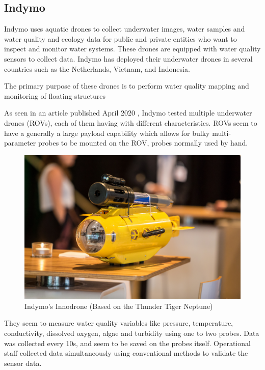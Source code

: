 \subsection{Indymo}
Indymo uses aquatic drones to collect underwater images, water samples and water quality and ecology data for public and private entities who want to inspect and monitor water systems. These drones are equipped with water quality sensors to collect data. Indymo has deployed their underwater drones in several countries such as the Netherlands, Vietnam, and Indonesia. \cite{indymoindonesia}

The primary purpose of these drones is to perform water quality mapping and monitoring of floating structures

As seen in an article published April 2020 \cite{indymoarticle}, Indymo tested multiple underwater drones (ROVs), each of them having with different characteristics. ROVs seem to have a generally a large payload capability which allows for bulky multi-parameter probes to be mounted on the ROV, probes normally used by hand.

\begin{figure}[h]
\centering
\includegraphics[scale=0.5]{similarprojects/11_innodrone.jpg}
\caption{Indymo's Innodrone (Based on the Thunder Tiger Neptune) \cite{indymoarticle}}
\end{figure}

They seem to measure water quality variables like pressure, temperature, conductivity, dissolved oxygen, algae and turbidity using one to two probes. Data was collected every 10s, and seem to be saved on the probes itself. Operational staff collected data simultaneously using conventional methods to validate the sensor data.

